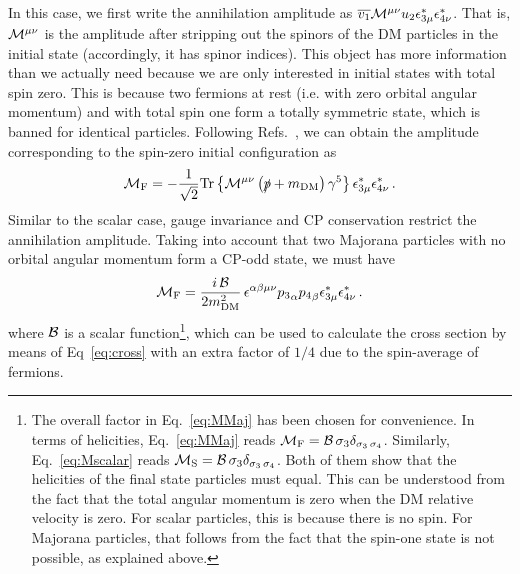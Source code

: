 In this case, we first  write the annihilation amplitude as $\overline{v_1} {\cal M}^{\mu\nu} u_2 \epsilon_{3\mu}^* \epsilon_{4\nu}^*$. That is,  $\cal M^{\mu\nu}$ is the amplitude after stripping out the spinors of the DM particles in the initial state (accordingly, it has spinor indices). This object has more information than we actually need because we are only interested in initial states with  total spin zero. This is because two fermions at rest (i.e. with zero orbital angular momentum) and with total spin one  form a totally symmetric state, which  is  banned for identical particles.  Following Refs.~\cite{Bergstrom:1997fh,Kuhn:1979bb}, we can obtain the amplitude corresponding to the spin-zero initial configuration as
\begin{equation}
\begin{split}
{\cal M}_\text{F} =- \frac{1}{\sqrt2}
\text{Tr} \left\{ {\cal M}^{\mu\nu} \left(\slashed{p}+m_{\text{DM}}\right) \gamma^5 \right\} \epsilon_{3\mu}^* \epsilon_{4\nu}^*\,.
\end{split}
\label{eq:P0}
\end{equation}
%
Similar to the scalar case, gauge invariance and CP conservation restrict the annihilation amplitude. Taking into account that two Majorana particles with no orbital angular momentum form a CP-odd state, we must have 
\begin{equation}
{\cal M}_\text{F} 
=\frac{{i\,\cal B}}{2m_{\text{DM}}^2}\,{\epsilon}^{\alpha\beta \mu \nu } {p_{3}}_\alpha {p_{4}}_\beta \epsilon_{3\mu}^* \epsilon_{4\nu}^*
\,.
\label{eq:MMaj}
\end{equation}
%
where $\cal B$ is a  scalar function\footnote{
The overall factor in Eq.~\eqref{eq:MMaj} has been chosen for convenience. In terms of helicities, Eq.~\eqref{eq:MMaj} reads ${\cal M}_\text{F} ={\cal B}\,\sigma_3  \delta_{\sigma_3\,\sigma_4}$. Similarly, 
Eq.~\eqref{eq:Mscalar} reads  ${\cal M}_\text{S} ={\cal B}\, \sigma_3 \delta_{\sigma_3\,\sigma_4}$. Both of them show that the helicities of the final state particles must equal. This can be understood from the fact that the total angular momentum is zero when the DM relative velocity is zero. For scalar particles, this is because there is no spin. For Majorana particles, that follows from the fact that the spin-one state is not possible, as explained above.}, which can be used to calculate the cross section by means of Eq~\eqref{eq:cross} with an extra factor of $1/4$ due to the spin-average of fermions.

